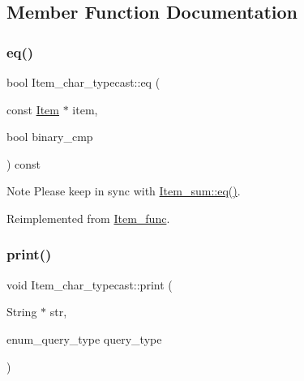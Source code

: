 \subsection{Member Function Documentation}
\mbox{\label{classItem__char__typecast_a8ed432731786b97255a7a47901c79768}} 
\subsubsection{\texorpdfstring{eq()}{eq()}}
{\footnotesize\ttfamily bool Item\+\_\+char\+\_\+typecast\+::eq (\begin{DoxyParamCaption}\item[{const \mbox{\hyperlink{classItem}{Item}} $\ast$}]{item,  }\item[{bool}]{binary\+\_\+cmp }\end{DoxyParamCaption}) const\hspace{0.3cm}{\ttfamily [virtual]}}

\begin{DoxyNote}{Note}
Please keep in sync with \mbox{\hyperlink{classItem__sum_aeab749252b834e0be4f00aac8ca523f5}{Item\+\_\+sum\+::eq()}}. 
\end{DoxyNote}


Reimplemented from \mbox{\hyperlink{classItem__func_a3de3f23377e6f0006dfccd375086365f}{Item\+\_\+func}}.

\mbox{\label{classItem__char__typecast_adf128fa02d763bb58d3501358a1d1e1a}} 
\subsubsection{\texorpdfstring{print()}{print()}}
{\footnotesize\ttfamily void Item\+\_\+char\+\_\+typecast\+::print (\begin{DoxyParamCaption}\item[{String $\ast$}]{str,  }\item[{enum\+\_\+query\+\_\+type}]{query\+\_\+type }\end{DoxyParamCaption})\hspace{0.3cm}{\ttfamily [virtual]}}

